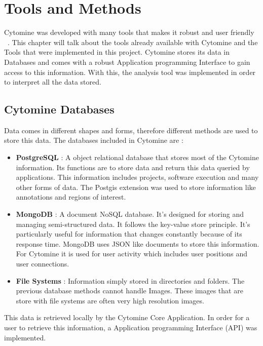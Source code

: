 \documentclass[a4paper,11pt]{report}
\numberwithin{figure}{chapter} %
\begin{document}
\chapter{Tools and Methods} \label{chapt:tools}

    Cytomine was developed with many tools that makes it robust and user friendly ~\cite{cyt}.
    This chapter will talk about the tools already available with Cytomine and the Tools that were implemented in this project.
    Cytomine stores its data in Databases and comes with a robust Application programming Interface to gain access to this information.
    With this, the analysis tool was implemented in order to interpret all the data stored.

    \section{Cytomine Databases}
    Data comes in different shapes and forms, therefore different methods are used to store this data.
    The databases included in Cytomine are :
    \begin{itemize}
        \item[\textbullet] \textbf{PostgreSQL} : A object relational database that stores most of the Cytomine information.
        Its functions are to store data and return this data queried by applications.
        This information includes projects, software execution and many other forms of data.
        The Postgis extension was used to store information like annotations and regions of interest.
        \item[\textbullet] \textbf{MongoDB} : A document NoSQL database.
        It's designed for storing and managing semi-structured data.
        It follows the key-value store principle.
        It's particularly useful for information that changes constantly because of its response time.
        MongoDB uses JSON like documents to store this information.
        For Cytomine it is used for user activity which includes user positions and user connections.
        \item[\textbullet] \textbf{File Systems} : Information simply stored in directories and folders.
        The previous database methods cannot handle Images.
        These images that are store with file systems are often very high resolution images.
    \end{itemize}

    This data is retrieved locally by the Cytomine Core Application.
    In order for a user to retrieve this information, a Application programming Interface (API) was implemented.
\end{document}
